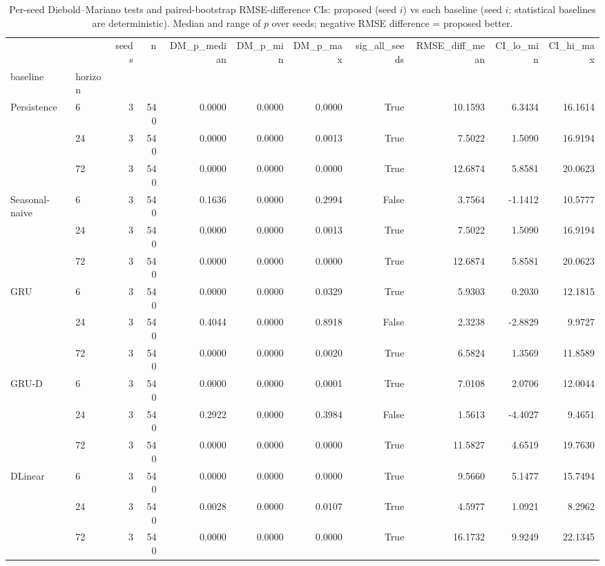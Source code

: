 \begin{table}
\caption{Per-seed Diebold--Mariano tests and paired-bootstrap RMSE-difference CIs: proposed (seed $i$) vs each baseline (seed $i$; statistical baselines are deterministic). Median and range of $p$ over seeds; negative RMSE difference = proposed better.}
\label{tab:significance}
\begin{tabular}{llrrrrrrrrr}
\toprule
 &  & seeds & n & DM\_p\_median & DM\_p\_min & DM\_p\_max & sig\_all\_seeds & RMSE\_diff\_mean & CI\_lo\_min & CI\_hi\_max \\
baseline & horizon &  &  &  &  &  &  &  &  &  \\
\midrule
\multirow[t]{3}{*}{Persistence} & 6 & 3 & 540 & 0.0000 & 0.0000 & 0.0000 & True & 10.1593 & 6.3434 & 16.1614 \\
 & 24 & 3 & 540 & 0.0000 & 0.0000 & 0.0013 & True & 7.5022 & 1.5090 & 16.9194 \\
 & 72 & 3 & 540 & 0.0000 & 0.0000 & 0.0000 & True & 12.6874 & 5.8581 & 20.0623 \\
\cline{1-11}
\multirow[t]{3}{*}{Seasonal-naive} & 6 & 3 & 540 & 0.1636 & 0.0000 & 0.2994 & False & 3.7564 & -1.1412 & 10.5777 \\
 & 24 & 3 & 540 & 0.0000 & 0.0000 & 0.0013 & True & 7.5022 & 1.5090 & 16.9194 \\
 & 72 & 3 & 540 & 0.0000 & 0.0000 & 0.0000 & True & 12.6874 & 5.8581 & 20.0623 \\
\cline{1-11}
\multirow[t]{3}{*}{GRU} & 6 & 3 & 540 & 0.0000 & 0.0000 & 0.0329 & True & 5.9303 & 0.2030 & 12.1815 \\
 & 24 & 3 & 540 & 0.4044 & 0.0000 & 0.8918 & False & 2.3238 & -2.8829 & 9.9727 \\
 & 72 & 3 & 540 & 0.0000 & 0.0000 & 0.0020 & True & 6.5824 & 1.3569 & 11.8589 \\
\cline{1-11}
\multirow[t]{3}{*}{GRU-D} & 6 & 3 & 540 & 0.0000 & 0.0000 & 0.0001 & True & 7.0108 & 2.0706 & 12.0044 \\
 & 24 & 3 & 540 & 0.2922 & 0.0000 & 0.3984 & False & 1.5613 & -4.4027 & 9.4651 \\
 & 72 & 3 & 540 & 0.0000 & 0.0000 & 0.0000 & True & 11.5827 & 4.6519 & 19.7630 \\
\cline{1-11}
\multirow[t]{3}{*}{DLinear} & 6 & 3 & 540 & 0.0000 & 0.0000 & 0.0000 & True & 9.5660 & 5.1477 & 15.7494 \\
 & 24 & 3 & 540 & 0.0028 & 0.0000 & 0.0107 & True & 4.5977 & 1.0921 & 8.2962 \\
 & 72 & 3 & 540 & 0.0000 & 0.0000 & 0.0000 & True & 16.1732 & 9.9249 & 22.1345 \\

\end{tabular}
\end{table}
